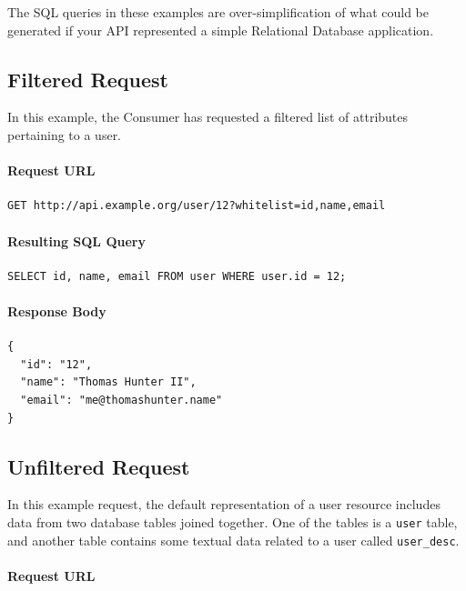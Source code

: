 The SQL queries in these examples are over-simplification of what could be generated if your API represented a simple Relational Database application.

\subsection{Filtered Request}

In this example, the Consumer has requested a filtered list of attributes pertaining to a user.

\paragraph{\textbf{Request URL}}

\begin{verbatim}
GET http://api.example.org/user/12?whitelist=id,name,email
\end{verbatim}

\paragraph{\textbf{Resulting SQL Query}}

\begin{verbatim}
SELECT id, name, email FROM user WHERE user.id = 12;
\end{verbatim}

\paragraph{\textbf{Response Body}}

\begin{verbatim}
{
  "id": "12",
  "name": "Thomas Hunter II",
  "email": "me@thomashunter.name"
}
\end{verbatim}

\subsection{Unfiltered Request}

In this example request, the default representation of a user resource includes data from two database tables joined together. One of the tables is a \texttt{user} table, and another table contains some textual data related to a user called \texttt{user\_desc}.

\paragraph{\textbf{Request URL}}

